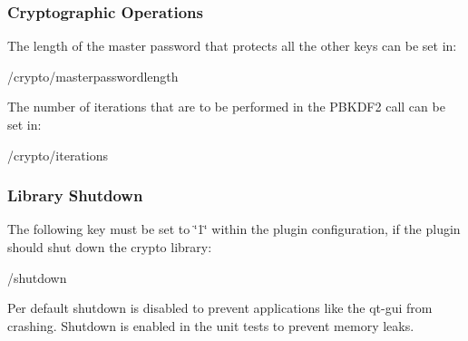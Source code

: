 \subsubsection*{Cryptographic Operations}

The length of the master password that protects all the other keys can be set in\+: \begin{DoxyVerb}    /crypto/masterpasswordlength
\end{DoxyVerb}


The number of iterations that are to be performed in the P\+B\+K\+D\+F2 call can be set in\+: \begin{DoxyVerb}    /crypto/iterations
\end{DoxyVerb}


\subsubsection*{Library Shutdown}

The following key must be set to {\ttfamily \char`\"{}1\char`\"{}} within the plugin configuration, if the plugin should shut down the crypto library\+: \begin{DoxyVerb}    /shutdown
\end{DoxyVerb}


Per default shutdown is disabled to prevent applications like the qt-\/gui from crashing. Shutdown is enabled in the unit tests to prevent memory leaks. 
